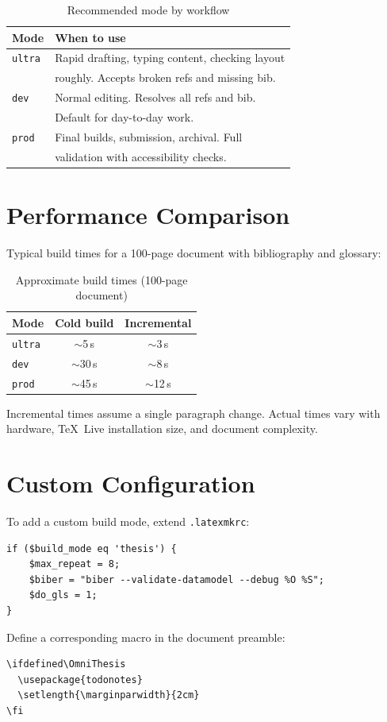 \begin{table}[htbp]
  \centering
  \caption{Recommended mode by workflow}
  \label{tab:mode-usage}
  \begin{tabular}{@{}lp{}@{}}
    \toprule
    \textbf{Mode} & \textbf{When to use} \\
    \midrule
    \texttt{ultra} & Rapid drafting, typing content, checking layout \\
                    & roughly.  Accepts broken refs and missing bib. \\
    \texttt{dev}   & Normal editing.  Resolves all refs and bib. \\
                    & Default for day-to-day work. \\
    \texttt{prod}  & Final builds, submission, archival.  Full \\
                    & validation with accessibility checks. \\
    \bottomrule
  \end{tabular}
\end{table}

\section{Performance Comparison}

Typical build times for a 100-page document with bibliography and
glossary:

\begin{table}[htbp]
  \centering
  \caption{Approximate build times (100-page document)}
  \label{tab:build-perf}
  \begin{tabular}{@{}lcc@{}}
    \toprule
    \textbf{Mode} & \textbf{Cold build} & \textbf{Incremental} \\
    \midrule
    \texttt{ultra} & $\sim$5\,s   & $\sim$3\,s \\
    \texttt{dev}   & $\sim$30\,s  & $\sim$8\,s \\
    \texttt{prod}  & $\sim$45\,s  & $\sim$12\,s \\
    \bottomrule
  \end{tabular}
\end{table}

Incremental times assume a single paragraph change.  Actual times vary
with hardware, TeX~Live installation size, and document complexity.

\section{Custom Configuration}

To add a custom build mode, extend \texttt{.latexmkrc}:

\begin{verbatim}
if ($build_mode eq 'thesis') {
    $max_repeat = 8;
    $biber = "biber --validate-datamodel --debug %O %S";
    $do_gls = 1;
}
\end{verbatim}

Define a corresponding macro in the document preamble:

\begin{verbatim}
\ifdefined\OmniThesis
  \usepackage{todonotes}
  \setlength{\marginparwidth}{2cm}
\fi
\end{verbatim}

